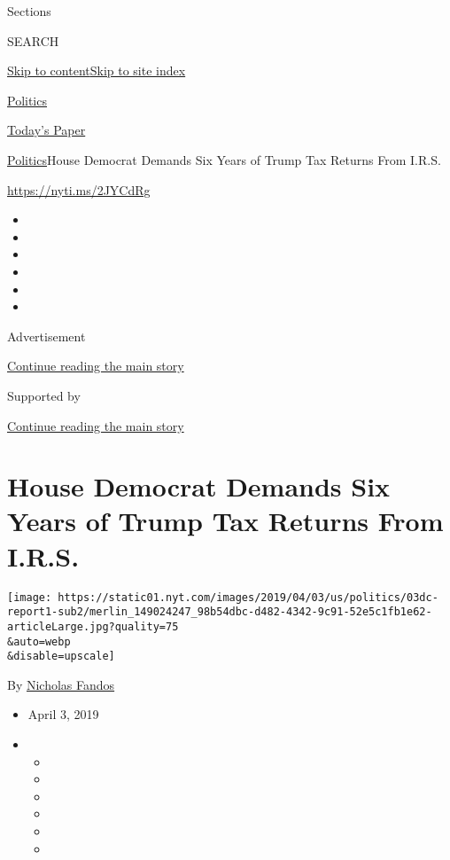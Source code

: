 Sections

SEARCH

\protect\hyperlink{site-content}{Skip to
content}\protect\hyperlink{site-index}{Skip to site index}

\href{https://www.nytimes.com/section/politics}{Politics}

\href{https://myaccount.nytimes.com/auth/login?response_type=cookie\&client_id=vi}{}

\href{https://www.nytimes.com/section/todayspaper}{Today's Paper}

\href{/section/politics}{Politics}\textbar{}House Democrat Demands Six
Years of Trump Tax Returns From I.R.S.

\url{https://nyti.ms/2JYCdRg}

\begin{itemize}
\item
\item
\item
\item
\item
\item
\end{itemize}

Advertisement

\protect\hyperlink{after-top}{Continue reading the main story}

Supported by

\protect\hyperlink{after-sponsor}{Continue reading the main story}

\hypertarget{house-democrat-demands-six-years-of-trump-tax-returns-from-irs}{%
\section{House Democrat Demands Six Years of Trump Tax Returns From
I.R.S.}\label{house-democrat-demands-six-years-of-trump-tax-returns-from-irs}}

\texttt{[image: https://static01.nyt.com/images/2019/04/03/us/politics/03dc-report1-sub2/merlin\_149024247\_98b54dbc-d482-4342-9c91-52e5c1fb1e62-articleLarge.jpg?quality=75\\\&auto=webp\\\&disable=upscale]}

By \href{https://www.nytimes.com/by/nicholas-fandos}{Nicholas Fandos}

\begin{itemize}
\item
  April 3, 2019
\item
  \begin{itemize}
  \item
  \item
  \item
  \item
  \item
  \item
  \end{itemize}
\end{itemize}

